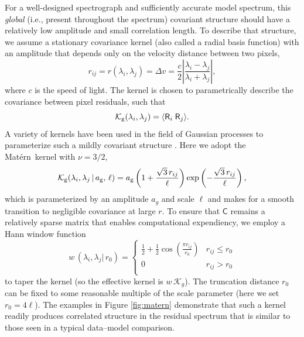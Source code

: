 \documentclass[iop,floatfix]{emulateapj}
\newcommand{\vR}{\mathsf{R}}
\newcommand{\vC}{\mathsf{C}}
\newcommand{\matern}{Mat\'{e}rn}
\begin{document}
For a well-designed spectrograph and sufficiently accurate model spectrum, this
{\it global} (i.e., present throughout the spectrum) covariant structure should
have a relatively low amplitude and small correlation length.  To describe that
structure, we assume a stationary covariance kernel (also called a radial basis
function) with an amplitude that depends only on the velocity distance between
two pixels, 
\begin{equation}
  r_{ij} = r(\lambda_i, \lambda_j) = \Delta v = \frac{c}{2} \left | \frac{\lambda_i 
   - \lambda_j}{ \lambda_i + \lambda_j} \right |,
\end{equation}
where $c$ is the speed of light.  The kernel is chosen to parametrically describe the covariance 
between pixel residuals, such that
\begin{equation}
  \mathcal{K}_{\rm g}(\lambda_i, \lambda_j) =  \langle \vR_i \; \vR_j \rangle.
  \label{eqn:expectation}
\end{equation}
A variety of kernels have been used in the field of Gaussian
processes to parameterize such a mildly covariant structure
\citep[e.g.,][]{rasmussen05}.  Here we adopt the \matern\ kernel with 
$\nu = 3/2$,
\begin{equation}
  \mathcal{K}_{\rm g}(\lambda_i, \lambda_j \, |\, a_{\rm g},\, \ell) = a_{\rm g} \left(1 + \frac{\sqrt{3}\, r_{ij}}{\ell} \right ) \exp 
   \left (- \frac{\sqrt{3}\, r_{ij}}{\ell} \right ),
   \label{eqn:global}
\end{equation}
which is parameterized by an amplitude $a_g$ and scale $\ell$ and makes for a smooth transition to 
negligible covariance at large $r$.  To ensure that $\vC$ remains a relatively sparse matrix that 
enables computational expendiency, we employ a Hann window function
\begin{equation}
  w\,(\lambda_i, \lambda_j |\, r_0) = \left \{ 
    \begin{array}{cc}
    \frac{1}{2} + \frac{1}{2} \cos \left(\frac{\pi r_{ij}}{r_0} \right) & r_{ij} \le r_0 \\
    0 & r_{ij} > r_0 \\
  \end{array}
  \right .
  \label{eqn:Hann}
\end{equation}
to taper the kernel (so the effective kernel is $w \, \mathcal{K}_g$).  The truncation distance 
$r_0$ can be fixed to some reasonable multiple of the scale parameter (here we set $r_0 = 4\ell$).  
The examples in Figure \ref{fig:matern} demonstrate that such a kernel readily produces correlated 
structure in the residual spectrum that is similar to those seen in a typical data--model 
comparison.  
\end{document}
